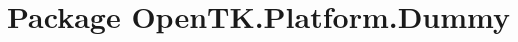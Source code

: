 \hypertarget{namespace_open_t_k_1_1_platform_1_1_dummy}{\section{Package Open\-T\-K.\-Platform.\-Dummy}
\label{namespace_open_t_k_1_1_platform_1_1_dummy}
}
